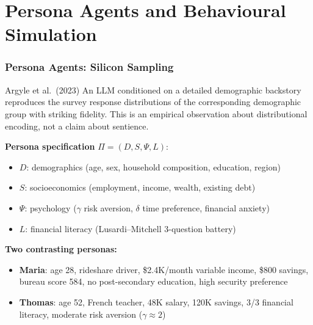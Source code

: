 \documentclass[9pt,t]{beamer}
\begin{document}
\section{Persona Agents and Behavioural Simulation}

\begin{frame}
\frametitle{Persona Agents: Silicon Sampling}

\begin{block}{Argyle et al.\ (2023)}
  An LLM conditioned on a detailed demographic backstory reproduces the survey response
  distributions of the corresponding demographic group with striking fidelity.
  This is an empirical observation about distributional encoding, not a claim about sentience.
\end{block}

\medskip
\textbf{Persona specification} $\Pi = (D, S, \Psi, L)$:
\begin{itemize}
  \item $D$: demographics (age, sex, household composition, education, region)
  \item $S$: socioeconomics (employment, income, wealth, existing debt)
  \item $\Psi$: psychology ($\gamma$ risk aversion, $\delta$ time preference, financial anxiety)
  \item $L$: financial literacy (Lusardi--Mitchell 3-question battery)
\end{itemize}

\medskip
\textbf{Two contrasting personas:}
\begin{itemize}
  \item \textbf{Maria}: age 28, rideshare driver, \$2.4K/month variable income, \$800 savings, bureau score 584, no post-secondary education, high security preference
  \item \textbf{Thomas}: age 52, French teacher, \texteuro48K salary, \texteuro120K savings, 3/3 financial literacy, moderate risk aversion ($\gamma \approx 2$)
\end{itemize}
\end{frame}
\end{document}
